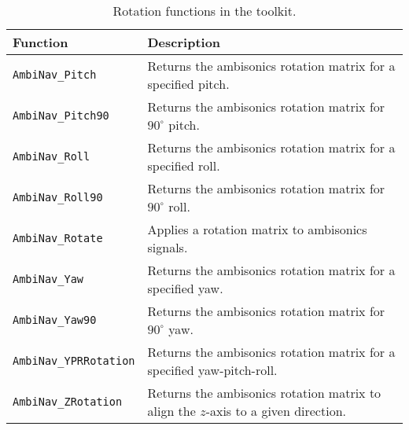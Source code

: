 \documentclass[11pt, oneside]{article}
\begin{document}
\begin{table}
\centering
  \begin{tabular}{| l | p{13cm} |}
    \hline
    \textbf{Function} & \textbf{Description} \\ \hline
    \texttt{AmbiNav\_Pitch} & Returns the ambisonics rotation matrix for a specified pitch. \\ \hline
    \texttt{AmbiNav\_Pitch90} & Returns the ambisonics rotation matrix for $90^\circ$ pitch. \\ \hline
    \texttt{AmbiNav\_Roll} & Returns the ambisonics rotation matrix for a specified roll. \\ \hline
    \texttt{AmbiNav\_Roll90} & Returns the ambisonics rotation matrix for $90^\circ$ roll. \\ \hline
    \texttt{AmbiNav\_Rotate} & Applies a rotation matrix to ambisonics signals. \\ \hline
    \texttt{AmbiNav\_Yaw} & Returns the ambisonics rotation matrix for a specified yaw. \\ \hline
    \texttt{AmbiNav\_Yaw90} & Returns the ambisonics rotation matrix for $90^\circ$ yaw. \\ \hline
    \texttt{AmbiNav\_YPRRotation} & Returns the ambisonics rotation matrix for a specified yaw-pitch-roll. \\ \hline
    \texttt{AmbiNav\_ZRotation} & Returns the ambisonics rotation matrix to align the $z$-axis to a given direction. \\ \hline
    \end{tabular}
    \caption{Rotation functions in the toolkit.}
    \label{tab:Rotation}
\end{table}
\end{document}
